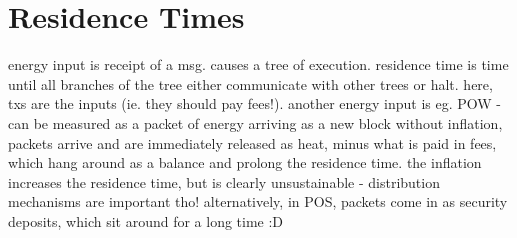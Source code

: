 \section{Residence Times}
energy input is receipt of a msg. 
causes a tree of execution. 
residence time is time until all branches of the tree either communicate with other trees or halt.
here, txs are the inputs (ie. they should pay fees!).
another energy input is eg. POW - can be measured as a packet of energy arriving as a new block
without inflation, packets arrive and are immediately released as heat, minus what is paid in fees,
which hang around as a balance and prolong the residence time.
the inflation increases the residence time, but is clearly unsustainable - distribution mechanisms are important tho!
alternatively, in POS, packets come in as security deposits, which sit around for a long time :D
